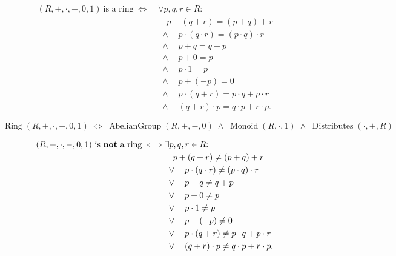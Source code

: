 \begin{remark*}
\[
\begin{aligned}
(R,+,\cdot,-,0,1)\ \text{is a ring}
\;\Longleftrightarrow\;
  &\forall p,q,r \in R{:} \\
  &\quad p + (q + r) = (p + q) + r \\
  &\;\land\quad p \cdot (q \cdot r) = (p \cdot q) \cdot r \\
  &\;\land\quad p + q = q + p \\
  &\;\land\quad p + 0 = p \\
  &\;\land\quad p \cdot 1 = p \\
  &\;\land\quad p + (-p) = 0 \\
  &\;\land\quad p \cdot (q + r) = p \cdot q + p \cdot r \\
  &\;\land\quad (q + r) \cdot p = q \cdot p + r \cdot p.
\end{aligned}
\]
\end{remark*}

\begin{remark*}
\[
\operatorname{Ring}(R,+,\cdot,-,0,1)
\;\Longleftrightarrow\;
\operatorname{AbelianGroup}(R,+,-,0)
\;\land\;
\operatorname{Monoid}(R,\cdot,1)
\;\land\;
\operatorname{Distributes}(\cdot,+,R)
\]
\end{remark*}

\begin{remark*}
\[
\begin{aligned}
(R,+,\cdot,-,0,1)\ \text{is \textbf{not} a ring}
\;\Longleftrightarrow\;
  &\exists p,q,r \in R{:} \\
  &\quad p + (q + r) \neq (p + q) + r \\
  &\;\lor\quad p \cdot (q \cdot r) \neq (p \cdot q) \cdot r \\
  &\;\lor\quad p + q \neq q + p \\
  &\;\lor\quad p + 0 \neq p \\
  &\;\lor\quad p \cdot 1 \neq p \\
  &\;\lor\quad p + (-p) \neq 0 \\
  &\;\lor\quad p \cdot (q + r) \neq p \cdot q + p \cdot r \\
  &\;\lor\quad (q + r) \cdot p \neq q \cdot p + r \cdot p.
\end{aligned}
\]
\end{remark*}


